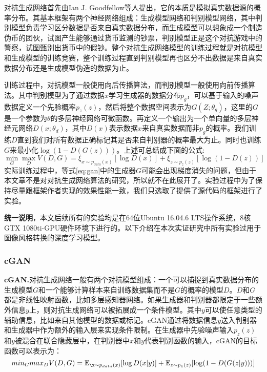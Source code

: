对抗生成网络\cite{GAN}首先由Ian J. Goodfellow等人提出，它的本质是模拟真实数据源的概率分布。其基本框架有两个神经网络组成：生成模型网络和判别模型网络，其中判别模型负责学习区分数据是否来自真实数据分布，而生成模型可以想象成一个制造伪币的团伙，试图产生能够通过货币监测的钞票，判别模型正是这个对抗游戏中的警察，试图甄别出货币中的假钞。整个对抗生成网络模型的训练过程就是对抗模型和生成模型的训练竞赛，整个训练过程直到判别模型再也区分不出数据是来自真实数据分布还是生成模型伪造的数据为止。

训练过程中，对抗模型一般使用向后传播算法，而判别模型一般使用向前传播算法。其中判别模型为了通过数据$x$学习生成器的数据分布$p_g$，可以基于输入的噪声数据定义一个先验概率$p_z(z)$，然后将整个数据空间表示为$G(Z;\theta_g)$，这里的$G$是一个参数为$\theta$的多层神经网络可微函数。再定义一个输出为一个单向量的多层神经元网络$D(x;\theta_d)$，其中$D(x)$表示数据$x$来自真实数据而非$p_g$的概率。我们训练$D$直到我们对所有数据正确标记其是否来自判别器的概率最大为止。同时也训练$G$来最小化$\log(1-D(G(z)))$。上述可总结成下面的公式:
\begin{equation}
    \label{eq:gan}
    \min_G\max_DV(D,G)=\xi_{x\sim p_{data}(x)}[\log D(x)]+\xi_{z\sim p_z(z)}[\log(1-D(z))]
\end{equation}
实际训练过程中，等式\eqref{eq:gan}中的生成器$G$可能会出现梯度消失的问题，但由于本文章不是对对抗生成网络算法的研究，所以就不在此展开了。实验过程中为了保持尽量跟框架作者实现的效果性能一致，我们只选取了提供了源代码的框架进行了实验。

\textbf{统一说明}，本文后续所有的实验均是在64位Ubuntu 16.04.6 LTS操作系统，8核GTX 1080ti-GPU硬件环境下进行的。以下介绍在本次实证研究中所有实验过用于图像风格转换的深度学习模型。

\subsubsection{cGAN}

\textbf{cGAN.}\cite{cGAN}\quad 对抗生成网络一般有两个对抗模型组成：一个可以捕捉到真实数据分布的生成模型$G$和一个能够计算样本来自训练数据集而不是$G$的概率的模型$D$。$D$和$G$都是非线性映射函数，比如多层感知器网络。如果生成器和判别器都限定于一些额外信息$y$上，则对抗生成网络可以被拓展成一个条件模型。其中$y$可以使任意类型的辅助信息，比如来自其他模型的数据或标记。cGAN通过将数据信息$y$送入判别器和生成器中作为额外的输入层来实现条件限制。在生成器中先验噪声输入$p_z(z)$和$y$被混合在联合隐藏层中，在判别器中$x$和$y$代表判别函数的输入，cGAN的目标函数可以表示为：
$$min_G max_D V(D,G)=\mathbb{E}_{\x\sim p_{data}(x)}[\log D(x|y)]+\mathbb{E}_{z\sim p_z(z)}[\log(1-D(G(z|y)))]$$

